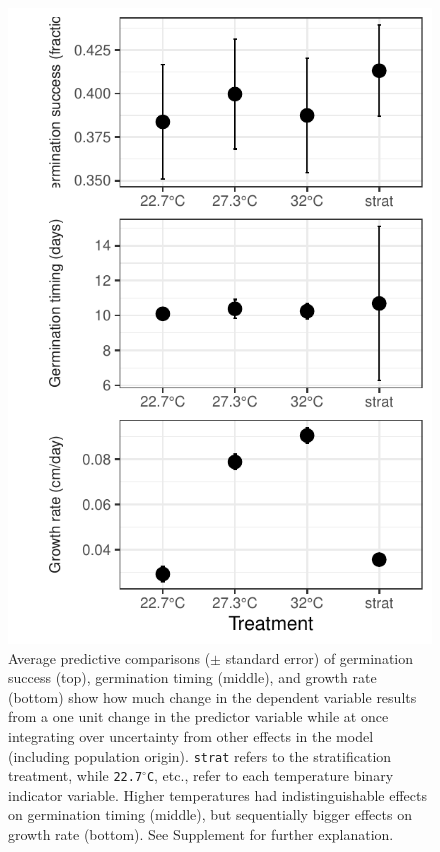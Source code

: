 \documentclass[11pt]{article}\usepackage[]{graphicx}\usepackage[]{color}
\begin{document}
\begin{figure}
	\begin{center}
	\includegraphics[width=.8\textwidth]{apc_fig.pdf}
	\caption{Average predictive comparisons ($\pm$ standard error) of germination success (top), germination timing (middle), and growth rate (bottom) show how much change in the dependent variable results from a one unit change in the predictor variable while at once integrating over uncertainty from other effects in the model (including population origin). \texttt{strat} refers to the stratification treatment, while \texttt{22.7$^{\circ}$C}, etc., refer to each temperature binary indicator variable. Higher temperatures had indistinguishable effects on germination timing (middle), but sequentially bigger effects on growth rate (bottom). See Supplement for further explanation.}
\label{fig:apc}
\end{center}
\end{figure}
\end{document}
